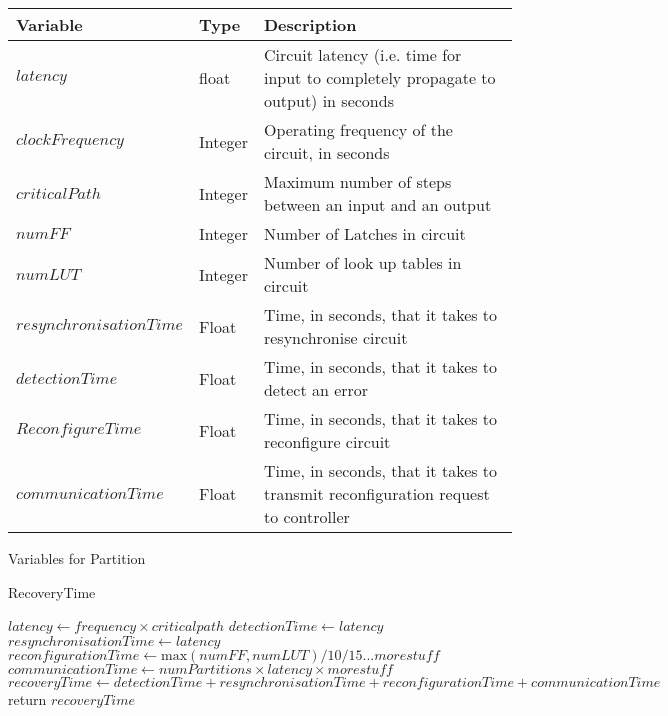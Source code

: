 \documentclass[12pt,final,oneside]{article} %
\begin{document}
\begin{algorithm}
    \begin{center}
        \begin{tabularx}{\linewidth}{llX}
        \toprule
        Variable & Type & Description\\
        \midrule
        $latency$ & float & Circuit latency (i.e. time for input to completely propagate to output) in seconds\\
        $clockFrequency$ & Integer & Operating frequency of the circuit, in seconds\\
        $criticalPath$ & Integer & Maximum number of steps between an input and an output\\
        $numFF$ & Integer & Number of Latches in circuit\\
        $numLUT$ & Integer & Number of look up tables in circuit\\
        $resynchronisationTime$ & Float & Time, in seconds, that it takes to resynchronise circuit\\
        $detectionTime$ & Float & Time, in seconds, that it takes to detect an error\\
        $ReconfigureTime$ & Float & Time, in seconds, that it takes to reconfigure circuit\\
        $communicationTime$ & Float & Time, in seconds, that it takes to transmit reconfiguration request to controller\\
        \bottomrule
        \end{tabularx}
        \caption{Variables for Partition}
        \label{varPart}
    \end{center}
   \caption{RecoveryTime}\label{main}
   \begin{algorithmic}[1]
            \State $latency \gets frequency\times{}criticalpath$
            \State $detectionTime \gets latency$
            \State $resynchronisationTime \gets latency$
            \State $reconfigurationTime \gets \mbox{max}(numFF, numLUT)/10/15...more stuff$
            \State $communicationTime \gets numPartitions\times{}latency\times{}more stuff$
            \State $recoveryTime \gets detectionTime+resynchronisationTime+reconfigurationTime+communicationTime$
            \State return $recoveryTime$
         \EndProcedure
   \end{algorithmic}
\end{algorithm}

\newpage
\end{document}
